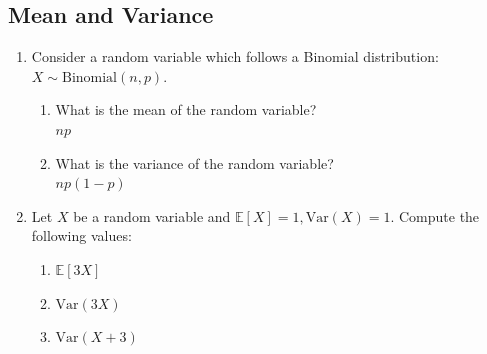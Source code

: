 \documentclass[a4paper]{article}
\theoremstyle{definition}
\newcommand{\Var}{\mathrm{Var}}
\newenvironment{soln}{
    \leavevmode\color{blue}\ignorespaces
}{}
\begin{document}
\subsection{Mean and Variance}
\begin{enumerate}
\item Consider a random variable which follows a Binomial
  distribution: $X \sim \text{Binomial}(n, p)$.
  \begin{enumerate}
  \item What is the mean of the random variable?\\
    \begin{soln}  $np$ \end{soln}
  \item What is the variance of the random variable?\\
    \begin{soln}  $np(1-p)$ \end{soln}
  \end{enumerate}

\item Let $X$ be a random variable and
  $\mathbb{E}[X] = 1, \Var(X) = 1$. Compute the following values:
  \begin{enumerate}
  \item $\mathbb{E}[3X]$\\
    \begin{soln}  3 \end{soln}
  \item $\Var(3X)$\\
    \begin{soln}  9 \end{soln}
  \item $\Var(X+3)$\\
    \begin{soln}  1 \end{soln}
  \end{enumerate}
\end{enumerate}

\end{document}
